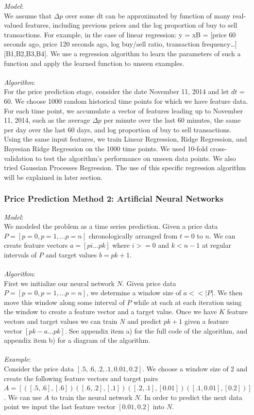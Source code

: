 \documentclass[10pt]{article}
\begin{document}
 	\emph{Model}:\\
 	We assume that $\Delta p$ over some dt can be approximated by function of many real-valued features, including previous prices and the log proportion of buy to sell transactions. For example, in the case of linear regression:  y = xB = [price 60 seconds ago, price 120 seconds ago, log buy/sell ratio, transaction frequency…] [B1,B2,B3,B4]. 
 We use a regression algorithm to learn the parameters of such a function and apply the learned function to unseen examples. \\\\
 	\emph{Algorithm}:\\
 For the price prediction stage, consider the date November 11, 2014 and let $dt$ = 60. We choose 1000 random historical time points for which we have feature data. For each time point, we accumulate a vector of features leading up to November 11, 2014, such as the average $\Delta p$ per minute over the last 60 minutes, the same per day over the last 60 days, and log proportion of buy to sell transactions. Using the same input features, we train Linear Regression, Ridge Regression, and Bayesian Ridge Regression on the 1000 time points. We used 10-fold cross-validation to test the algorithm’s performance on unseen data points. We also tried Gaussian Processes Regression.  The use of this specific regression algorithm will be explained in later section.
 
   \subsubsection*{Price Prediction Method 2: Artificial Neural Networks} 					

\emph{Model}:\\
 We modeled the problem as a time series prediction. Given a price data $P = [p = 0, p = 1, ... p = n]$ chronologically arranged from $t = 0$ to $n.$ We can create feature vectors  $a = [pi ... pk]$ where $i >= 0$ and $k < n - 1$ at regular intervals of $P$ and target values $b = pk+1$. \\\\
 	\emph{Algorithm}:\\
 First we initialize our neural network $N$. Given price data  $P = [p = 0, p = 1, ... p = n]$, we determine a window size of $a << |P|$. We then move this window along some interval of $P$ while at each at each iteration using the window to create a feature vector and a target value. Once we have $K$ feature vectors and target values we can train $N$ and predict $pk+1$ given a feature vector $[pk - a ... pk]$.  See appendix item a) for the full code of the algorithm, and appendix item b) for a diagram of the algorithm.\\\\
 	\emph{Example}:\\
 Consider the price data $[.5, .6, .2, .1, 0.01, 0.2]$. We choose a window size of 2 and create the following feature vectors and target pairs $A = [ ([.5, .6], [.6]) ([.6, .2], [.1]) ([.2, .1], [0.01]) ([.1, 0.01], [0.2]) ]$. We can use $A$ to train the neural network $ N$. In order to predict the next data point we input the last feature vector $[0.01, 0.2]$ into $N$.  
  
\end{document}
